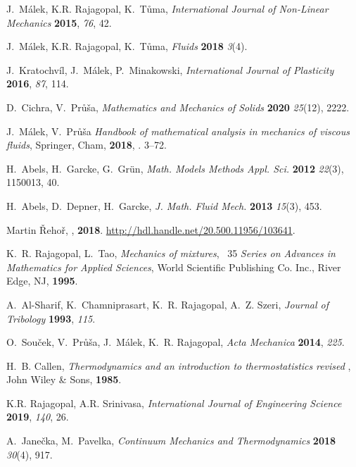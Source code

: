 \documentclass[a4paper]{article}
\begin{document}
\begin{thebibliography}{10}
J.~Málek, K.R. Rajagopal, K.~Tůma, \textit{International Journal of
  Non-Linear Mechanics} \textbf{2015}, \textit{76}, 42.

J.~Málek, K.R. Rajagopal, K.~Tůma, \textit{Fluids} \textbf{2018}
  \textit{3}(4).

J.~Kratochvíl, J.~Málek, P.~Minakowski, \textit{International Journal of
  Plasticity} \textbf{2016}, \textit{87}, 114.

D.~Cichra, V.~Průša, \textit{Mathematics and Mechanics of Solids}
  \textbf{2020} \textit{25}(12), 2222.

J.~M\'{a}lek, V.~Pr\r{u}\v{s}a \bblin{} \textit{Handbook of mathematical
  analysis in mechanics of viscous fluids}, Springer, Cham, \textbf{2018},
  \bblpp{}. 3--72.

H.~Abels, H.~Garcke, G.~Gr\"{u}n, \textit{Math. Models Methods Appl. Sci.}
  \textbf{2012} \textit{22}(3), 1150013, 40.

H.~Abels, D.~Depner, H.~Garcke, \textit{J. Math. Fluid Mech.} \textbf{2013}
  \textit{15}(3), 453.

Martin Řehoř, \bblphdthesis{}, \textbf{2018}.
  \urlprefix\url{http://hdl.handle.net/20.500.11956/103641}.

K.~R. Rajagopal, L.~Tao, \textit{Mechanics of mixtures}, \bblvol{}~35 \bblof{}
  \textit{Series on Advances in Mathematics for Applied Sciences}, World
  Scientific Publishing Co. Inc., River Edge, NJ, \textbf{1995}.

A.~Al-Sharif, K.~Chamniprasart, K.~R. Rajagopal, A.~Z. Szeri, \textit{Journal
  of Tribology} \textbf{1993}, \textit{115}.

O.~Sou\v{c}ek, V.~Pr\r{u}\v{s}a, J.~M\'{a}lek, K.~R. Rajagopal, \textit{Acta
  Mechanica} \textbf{2014}, \textit{225}.

H.~B. Callen, \textit{Thermodynamics and an introduction to thermostatistics}
  \textit{revised \bbledn{}}, John Wiley \& Sons, \textbf{1985}.

K.R. Rajagopal, A.R. Srinivasa, \textit{International Journal of Engineering
  Science} \textbf{2019}, \textit{140}, 26.

A.~Janečka, M.~Pavelka, \textit{Continuum Mechanics and Thermodynamics}
  \textbf{2018} \textit{30}(4), 917.


\end{thebibliography}
\end{document}
